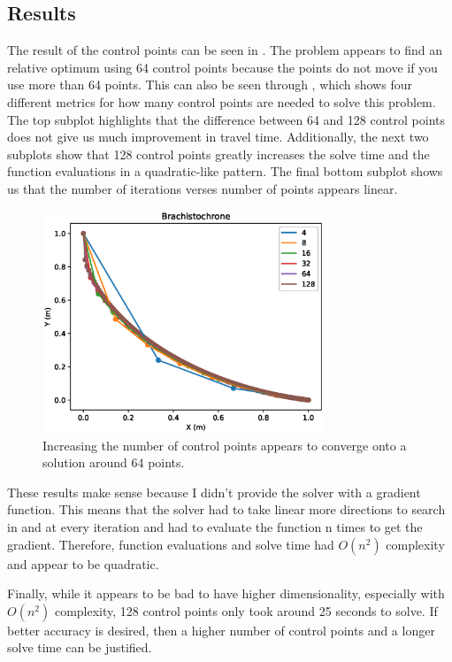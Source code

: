 \documentclass{article}
\begin{document}
\subsection{Results}

The result of the control points can be seen in . The problem appears to find an relative optimum using 64 control points because the points do not move if you use more than 64 points. This can also be seen through , which shows four different metrics for how many control points are needed to solve this problem. The top subplot highlights that the difference between 64 and 128 control points does not give us much improvement in travel time. Additionally, the next two subplots show that 128 control points greatly increases the solve time and the function evaluations in a quadratic-like pattern. The final bottom subplot shows us that the number of iterations verses number of points appears linear. 


\begin{figure}[htbp]
	\centering
	\includegraphics[width=0.75\textwidth]{figures/brachistrochrone.eps}
	\caption{Increasing the number of control points appears to converge onto a solution around 64 points.}
	\label{fig:results}
\end{figure}


These results make sense because I didn't provide the solver with a gradient function. This means that the solver had to take linear more directions to search in and at every iteration and had to evaluate the function n times to get the gradient. Therefore, function evaluations and solve time had $O(n^2)$ complexity and appear to be quadratic. 

Finally, while it appears to be bad to have higher dimensionality, especially with $O(n^2)$ complexity, 128 control points only took around 25 seconds to solve. If better accuracy is desired, then a higher number of control points and a longer solve time can be justified.
\end{document}
